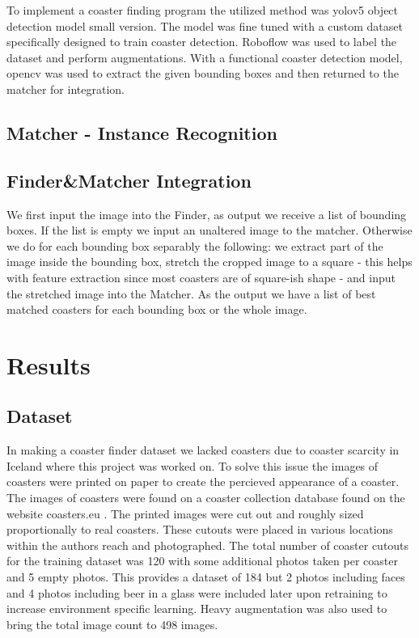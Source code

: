 \documentclass{article}
\begin{document}
To implement a coaster finding program the utilized method was yolov5 object detection model small version. The model was fine tuned
with a custom dataset specifically designed to train coaster detection. Roboflow was used to label the dataset and perform augmentations.
With a functional coaster detection model, opencv was used to extract the given bounding boxes and then returned to the matcher for 
integration.

\subsection{Matcher - Instance Recognition}


\subsection{Finder\&Matcher Integration}

We first input the image into the Finder, as output we receive a list of bounding boxes.
If the list is empty we input an unaltered image to the matcher.
Otherwise we do for each bounding box separably the following: 
we extract part of the image inside the bounding box, 
stretch the cropped image to a square - this helps with feature extraction since most coasters are of square-ish shape - 
and input the stretched image into the Matcher.
As the output we have a list of best matched coasters for each bounding box or the whole image. 



\section{Results}
\subsection{Dataset}
In making a coaster finder dataset we lacked coasters due to coaster scarcity in Iceland where this project was worked on.
To solve this issue the images of coasters were printed on paper to create the percieved appearance of a coaster. The images of coasters
were found on a coaster collection database found on the website coasters.eu \cite{}. The printed images were cut out and roughly sized proportionally to real coasters. 
These cutouts were placed in various locations within the authors reach and photographed. The total number of coaster cutouts for the 
training dataset was 120 with some additional photos taken per coaster and 5 empty photos. This provides a dataset of 184 but 2 photos
including faces and 4 photos including beer in a glass were included later upon retraining to increase environment specific learning.
Heavy augmentation was also used to bring the total image count to 498 images.
\end{document}
